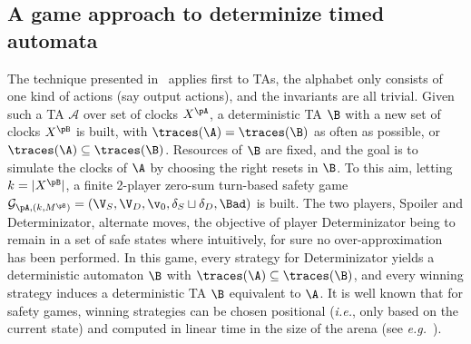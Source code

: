 \documentclass{LMCS}
\theoremstyle{plain}\newtheorem{proposition}[thm]{Proposition}
\begin{document}
\subsection{A game approach to determinize timed automata}
The technique presented
in~\cite{BertrandStainerJeronKrichen-FOSSACS2011} applies first to
TAs, \ie the alphabet only consists of one kind of actions (say output
actions), and the invariants are all trivial. Given such a TA
$\mathcal{A}$ over set of clocks $X^\pA$, a deterministic TA $\B$
with a new set of clocks $X^\pB$ is built, with $\traces(\A)=
\traces(\B)$ as often as possible, or $\traces(\A)\subseteq
\traces(\B)$.
Resources of $\B$ are fixed, and the goal is to simulate the clocks of $\A$ by choosing
the right resets in $\B$.  To this aim, letting $k=|X^\pB|$, a finite
2-player zero-sum turn-based safety game
$\mathcal{G}_{\pA,(k,M^\pB)}=(\V_S,\V_D,\v_0,\delta_S\sqcup\delta_D,\Bad)$
is built. The two players, Spoiler and Determinizator, alternate moves, the
objective of player Determinizator being to remain in a set of safe
states
where intuitively, for sure no over-approximation has been performed.
In this game, every strategy for Determinizator yields a deterministic
automaton $\B$ with $\traces(\A)\subseteq \traces(\B)$, and every
winning strategy induces a deterministic TA $\B$ equivalent to
$\A$. It is well known that for safety games, winning strategies can be
chosen positional (\emph{i.e.}, only based on the current state) and
computed in linear time in the size of the arena (see
\emph{e.g.}~\cite{mazala-lncs2500}).
\end{document}
